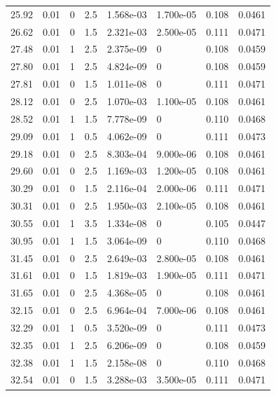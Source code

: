 \documentclass[preview]{standalone}
\begin{document}
{{{\begin{tabular}{L{1.2cm}C{1.2cm} C{0.3cm}C{0.5cm} C{1.4cm}C{1.4cm} C{1.4cm}C{1.4cm}}
  25.92  &  0.01  & 0     & 2.5 &  1.568e-03  & 1.700e-05  & 0.108 &  0.0461   \\ 
  26.62  &  0.01  & 0     & 1.5 &  2.321e-03  & 2.500e-05  & 0.111 &  0.0471   \\ 
  27.48  &  0.01  & 1     & 2.5 &  2.375e-09  & 0  & 0.108 &  0.0459   \\ 
  27.80  &  0.01  & 1     & 2.5 &  4.824e-09  & 0  & 0.108 &  0.0459   \\ 
  27.81  &  0.01  & 0     & 1.5 &  1.011e-08  & 0  & 0.111 &  0.0471   \\ 
  28.12  &  0.01  & 0     & 2.5 &  1.070e-03  & 1.100e-05  & 0.108 &  0.0461   \\ 
  28.52  &  0.01  & 1     & 1.5 &  7.778e-09  & 0  & 0.110 &  0.0468   \\ 
  29.09  &  0.01  & 1     & 0.5 &  4.062e-09  & 0  & 0.111 &  0.0473   \\ 
  29.18  &  0.01  & 0     & 2.5 &  8.303e-04  & 9.000e-06  & 0.108 &  0.0461   \\ 
  29.60  &  0.01  & 0     & 2.5 &  1.169e-03  & 1.200e-05  & 0.108 &  0.0461   \\ 
  30.29  &  0.01  & 0     & 1.5 &  2.116e-04  & 2.000e-06  & 0.111 &  0.0471   \\ 
  30.31  &  0.01  & 0     & 2.5 &  1.950e-03  & 2.100e-05  & 0.108 &  0.0461   \\ 
  30.55  &  0.01  & 1     & 3.5 &  1.334e-08  & 0  & 0.105 &  0.0447   \\ 
  30.95  &  0.01  & 1     & 1.5 &  3.064e-09  & 0  & 0.110 &  0.0468   \\ 
  31.45  &  0.01  & 0     & 2.5 &  2.649e-03  & 2.800e-05  & 0.108 &  0.0461   \\ 
  31.61  &  0.01  & 0     & 1.5 &  1.819e-03  & 1.900e-05  & 0.111 &  0.0471   \\ 
  31.65  &  0.01  & 0     & 2.5 &  4.368e-05  & 0  & 0.108 &  0.0461   \\ 
  32.15  &  0.01  & 0     & 2.5 &  6.964e-04  & 7.000e-06  & 0.108 &  0.0461   \\ 
  32.29  &  0.01  & 1     & 0.5 &  3.520e-09  & 0  & 0.111 &  0.0473   \\ 
  32.35  &  0.01  & 1     & 2.5 &  6.206e-09  & 0  & 0.108 &  0.0459   \\ 
  32.38  &  0.01  & 1     & 1.5 &  2.158e-08  & 0  & 0.110 &  0.0468   \\ 
  32.54  &  0.01  & 0     & 1.5 &  3.288e-03  & 3.500e-05  & 0.111 &  0.0471   \\ 

\end{tabular}}}}
\end{document}
